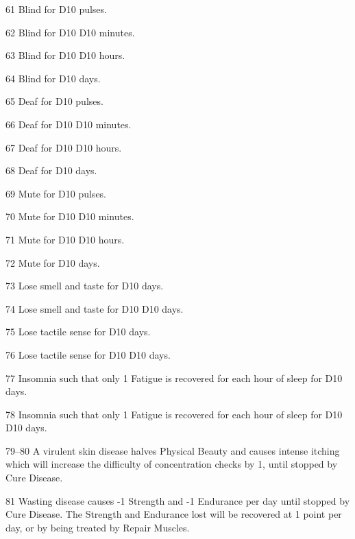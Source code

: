 \begin{multicols}{3}
\begin{Description}
\item[61] Blind for D10 pulses.

\item[62] Blind for D10 \x D10 minutes.

\item[63] Blind for D10 \x D10 hours.

\item[64] Blind for D10 days.

\item[65] Deaf for D10 pulses.

\item[66] Deaf for D10 \x D10 minutes.

\item[67] Deaf for D10 \x D10 hours.

\item[68] Deaf for D10 days.

\item[69] Mute for D10 pulses.

\item[70] Mute for D10 \x D10 minutes.

\item[71] Mute for D10 \x D10 hours.

\item[72] Mute for D10 days.

\item[73] Lose smell and taste for D10 days.

\item[74] Lose smell and taste for D10 \x D10 days.

\item[75] Lose tactile sense for D10 days.

\item[76] Lose tactile sense for D10 \x D10 days.

\item[77] Insomnia such that only 1 Fatigue is recovered for each hour
of sleep for D10 days.

\item[78] Insomnia such that only 1 Fatigue is recovered for each hour
of sleep for D10 \x D10 days.

\item[79--80] A virulent skin disease halves Physical Beauty and causes
intense itching which will increase the difficulty of concentration
checks by 1, until stopped by Cure Disease.

\item[81] Wasting disease causes -1 Strength and -1 Endurance per day
until stopped by Cure Disease.  The Strength and Endurance lost will
be recovered at 1 point per day, or by being treated by Repair
Muscles.


\end{Description}
\end{multicols}
